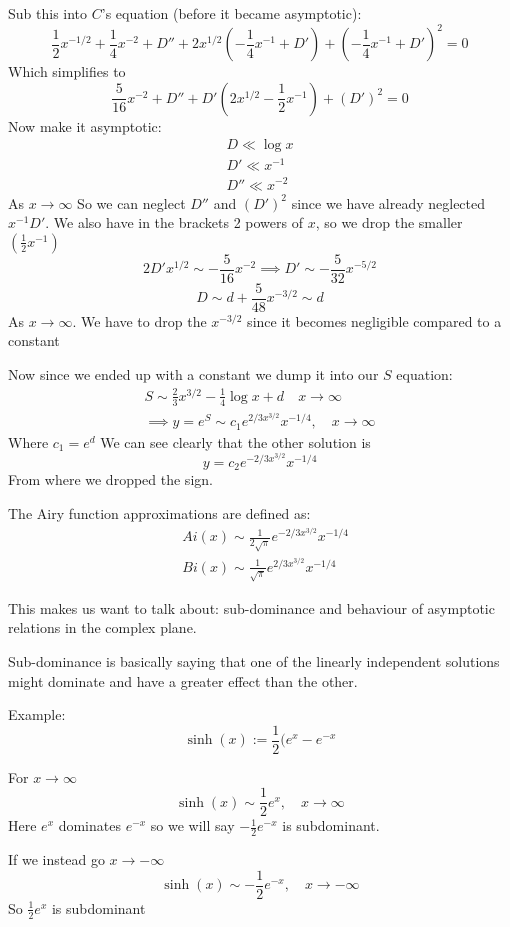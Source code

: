 \documentclass{/home/janmebows/Documents/LatexTemplates/myassignment}
\begin{document}
Sub this into $C$'s equation (before it became asymptotic):
\[\frac12 x^{-1/2} + \frac14 x^{-2} + D'' + 2x^{1/2} (-\frac14 x^{-1} + D') + (-\frac14 x^{-1} + D')^2 = 0\]
Which simplifies to
\[\frac5{16}x^{-2} + D'' + D'(2x^{1/2} - \frac12 x^{-1}) + (D')^2 = 0\]
Now make it asymptotic:
\begin{align*}
    D \ll \log x\\
    D' \ll x^{-1}\\
    D'' \ll x^{-2}
\end{align*}
As $x\to \infty$
So we can neglect $D''$ and $(D')^2$ since we have already neglected $x^{-1} D'$.
We also have in the brackets 2 powers of $x$, so we drop the smaller $(\frac12 x^{-1})$
\[2D' x^{1/2} \sim - \frac5{16} x^{-2} \implies D' \sim -\frac{5}{32} x^{-5/2}\]
\[D\sim d+ \frac5{48} x^{-3/2} \sim d\]
As $x\to\infty$. We have to drop the $x^{-3/2}$ since it becomes negligible compared to a constant

Now since we ended up with a constant we dump it into our $S$ equation:
\begin{align*}
    S \sim \frac23 x^{3/2} - \frac14 \log x + d \quad x\to \infty\\
    \implies y = e^S \sim c_1 e^{2/3 x^{3/2}} x^{-1/4}, \quad x \to \infty
\end{align*}
Where $c_1 = e^d$
We can see clearly that the other solution is
\[y = c_2 e^{-2/3 x^{3/2}} x^{-1/4}\]
From where we dropped the sign.

The Airy function approximations are defined as:
\begin{align*}
    & Ai(x) \sim \frac{1}{2\sqrt{\pi}} e^{-2/3 x^{3/2}} x^{-1/4}\\
    & Bi(x) \sim \frac{1}{\sqrt{\pi}} e^{2/3 x^{3/2}} x^{-1/4}
\end{align*}

This makes us want to talk about: sub-dominance and behaviour of asymptotic relations in the complex plane.

Sub-dominance is basically saying that one of the linearly independent solutions might dominate and have a greater effect than the other.

Example:
\[\sinh(x) := \frac12 (e^x - e^{-x}\]

For $x\to \infty$
\[\sinh(x) \sim \frac12 e^x, \quad x\to\infty\]
Here $e^x$ dominates $e^{-x}$ so we will say $-\frac12 e^{-x}$ is subdominant.

If we instead go $x\to-\infty$
\[\sinh(x) \sim -\frac12 e^{-x}, \quad x\to-\infty\]
So $\frac12 e^{x}$ is subdominant
\end{document}

